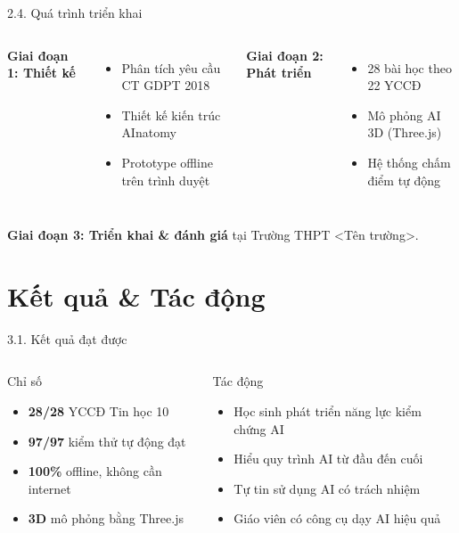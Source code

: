 \documentclass[10pt, aspectratio=169]{beamer}
\begin{document}
\begin{frame}{2.4. Quá trình triển khai}
    \begin{columns}
        \textbf{Giai đoạn 1: Thiết kế}
        \begin{itemize}
            \item Phân tích yêu cầu CT GDPT 2018
            \item Thiết kế kiến trúc AInatomy
            \item Prototype offline trên trình duyệt
        \end{itemize}
        \textbf{Giai đoạn 2: Phát triển}
        \begin{itemize}
            \item 28 bài học theo 22 YCCĐ
            \item Mô phỏng AI 3D (Three.js)
            \item Hệ thống chấm điểm tự động
        \end{itemize}
    \end{columns}
    
    \vspace{0.5em}
    \textbf{Giai đoạn 3: Triển khai \& đánh giá} tại Trường THPT <Tên trường>.
\end{frame}

\section{Kết quả \& Tác động}

\begin{frame}{3.1. Kết quả đạt được}
    \begin{columns}
        \begin{block}{Chỉ số}
            \begin{itemize}
                \item \textbf{28/28} YCCĐ Tin học 10
                \item \textbf{97/97} kiểm thử tự động đạt
                \item \textbf{100\%} offline, không cần internet
                \item \textbf{3D} mô phỏng bằng Three.js
            \end{itemize}
        \end{block}
        \begin{block}{Tác động}
            \begin{itemize}
                \item Học sinh phát triển năng lực kiểm chứng AI
                \item Hiểu quy trình AI từ đầu đến cuối
                \item Tự tin sử dụng AI có trách nhiệm
                \item Giáo viên có công cụ dạy AI hiệu quả
            \end{itemize}
        \end{block}
    \end{columns}
\end{frame}
\end{document}
